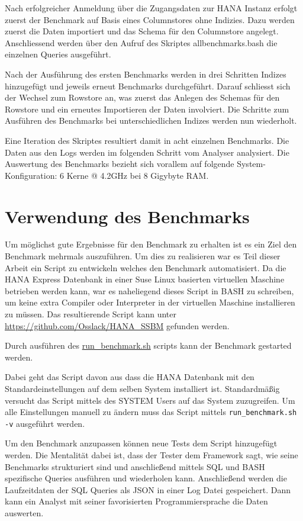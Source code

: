 Nach erfolgreicher Anmeldung über die Zugangsdaten zur HANA Instanz erfolgt zuerst der Benchmark auf Basis eines Columnstores ohne Indizies. Dazu werden zuerst die Daten importiert und das Schema für den Columnstore angelegt. Anschliessend werden über den Aufruf des Skriptes {\glqq}all{\textunderscore}benchmarks.bash{\grqq} die einzelnen Queries ausgeführt. 

Nach der Ausführung des ersten Benchmarks werden in drei Schritten Indizes hinzugefügt und jeweils erneut Benchmarks durchgeführt. Darauf schliesst sich der Wechsel zum Rowstore an, was zuerst das Anlegen des Schemas für den Rowstore und ein erneutes Importieren der Daten involviert. Die Schritte zum Ausführen des Benchmarks bei unterschiedlichen Indizes werden nun wiederholt. 

Eine Iteration des Skriptes resultiert damit in acht einzelnen Benchmarks. Die Daten aus den Logs werden im folgenden Schritt vom Analyser analysiert. Die Auswertung des Benchmarks bezieht sich vorallem auf folgende System-Konfiguration: 6 Kerne @ 4.2GHz bei 8 Gigybyte RAM. 

\section{Verwendung des Benchmarks}

Um möglichst gute Ergebnisse für den Benchmark zu erhalten ist es ein
Ziel den Benchmark mehrmals auszuführen. Um dies zu realisieren war es Teil dieser
Arbeit ein Script zu entwickeln welches den Benchmark automatisiert.
Da die HANA Express Datenbank in einer Suse Linux basierten virtuellen Maschine
betrieben werden kann, war es naheliegend dieses Script in BASH\cite{bash}
zu schreiben, um keine extra Compiler oder Interpreter in der virtuellen Maschine
installieren zu müssen.
Das resultierende Script kann unter \faGithub \url{https://github.com/Osslack/HANA_SSBM}
gefunden werden.

Durch ausführen des \href{https://github.com/Osslack/HANA_SSBM/blob/master/src/run_benchmark.bash}{run\_benchmark.sh} scripts kann der Benchmark gestarted werden.

Dabei geht das Script davon aus dass die HANA Datenbank mit den Standardeinstellungen
auf dem selben System installiert ist.
Standardmäßig versucht das Script mittels des SYSTEM Users auf das System zuzugreifen.
Um alle Einstellungen manuell zu ändern muss das Script mittels \verb+run_benchmark.sh -v+
ausgeführt werden.

Um den Benchmark anzupassen können neue Tests dem Script hinzugefügt werden.
Die Mentalität dabei ist, dass der Tester dem Framework sagt, wie seine
Benchmarks strukturiert sind und anschließend mittels SQL\cite{sql} und BASH
spezifische Queries ausführen und wiederholen kann.
Anschließend werden die Laufzeitdaten der SQL Queries als JSON\cite{json} in einer
Log Datei gespeichert.
Dann kann ein Analyst mit seiner favorisierten Programmiersprache
die Daten auswerten.


